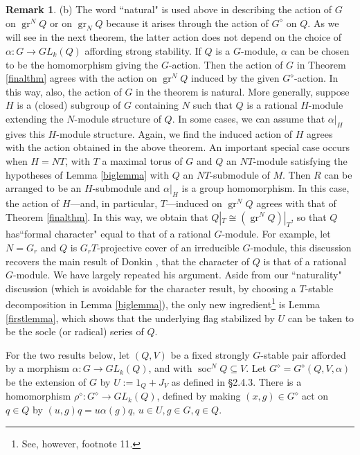 \documentclass[11pt,leqno,amscd,amssymb,verbatim, url]{amsart}
\theoremstyle{definition}
\newtheorem{rem}[thm]{Remark}
\numberwithin{equation}{thm}
\newcommand{\gr}{\operatorname{ {gr}}}
\newcommand{\soc}{\operatorname{soc}}
\begin{document}
\begin{rem}
(b) The word ``natural" is used above in describing the action of $G$ on $\gr^NQ$ or on $\gr_NQ$
because it arises through the action of $G^\diamond$ on $Q$. As we will see in the next theorem, the latter action does not depend on the choice of
$\alpha:G\to GL_k(Q)$ affording strong stability. If $Q$ is a $G$-module, $\alpha$ can be chosen to be
the homomorphism giving the $G$-action. Then the action of $G$ in Theorem \ref{finalthm} agrees
with the action on $\gr^NQ$ induced by the given $G^\diamond$-action. In this way, also, the action of $G$ in the theorem
is natural. More generally, suppose $H$ is a (closed) subgroup of $G$ containing $N$ such that $Q$ is a rational
$H$-module extending the  $N$-module structure of $Q$. In some cases, we can assume that $\alpha|_H$
gives this $H$-module structure. Again, we find the induced action of $H$ agrees with the action obtained in
the above theorem. An important special case occurs when $H=NT$, with $T$ a maximal torus of $G$ and $Q$ an $NT$-module
satisfying the hypotheses of Lemma \ref{biglemma} with $Q$ an $NT$-submodule of $M$. Then $R$ can be arranged to be
an $H$-submodule and $\alpha|_H$ is a group homomorphism. In this case, the action of $H$---and, in particular, $T$---induced
on $\gr^NQ$ agrees with that of Theorem \ref{finalthm}. In this way, we obtain that $Q|_T\cong(\gr^NQ)|_T$, so that
$Q$ has``formal character" equal to that of a rational $G$-module. For example, let $N=G_r$ and $Q$ is $G_rT$-projective cover of an irreducible $G$-module,  this discussion recovers the main result of Donkin \cite{Donkin1}, that the character of $Q$ is that of a rational $G$-module. We have largely repeated his argument. Aside from our ``naturality" discussion (which is avoidable for the character result, by choosing a $T$-stable decomposition in Lemma
\ref{biglemma}), the only
new ingredient\footnote{See, however, footnote 11.} is Lemma \ref{firstlemma}, which shows that the underlying flag stabilized by $U$ can be taken to be the socle (or radical) series of $Q$. \end{rem}

For the two results below, let $(Q,V)$ be a fixed strongly $G$-stable pair afforded by a morphism 
$\alpha:G\to GL_k(Q)$, and with $\soc^NQ\subseteq V$. Let $G^\diamond=G^\diamond(Q,V,\alpha)$ be the extension of $G$ by $U:=1_Q+J_V$ as defined in \S2.4.3. There is a homomorphism
$\rho^\diamond:G^\diamond\to GL_k(Q)$, defined by making $(x,g)\in G^\diamond$ act on $q\in Q$
by $(u,g)q=u\alpha(g)q$, $u\in U, g\in G, q\in Q$. 
\end{document}

